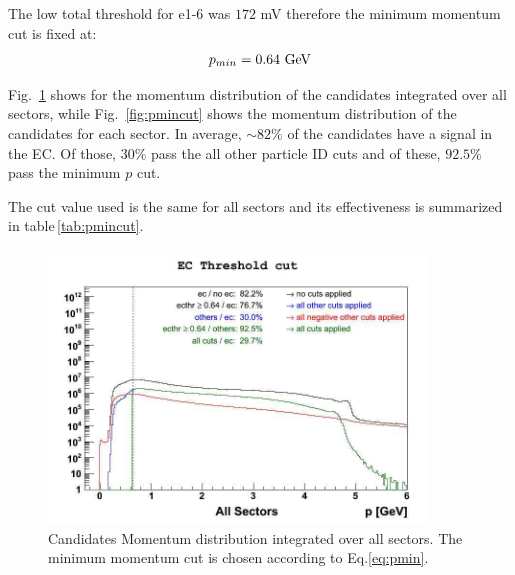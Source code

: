 The low total threshold for e1-6 was $172$ mV therefore the minimum momentum cut is fixed at:
$$
p_{min} = 0.64\,\,{\rm GeV}
$$

Fig.~\ref{fig:pmincut_alls} shows for the momentum distribution of the candidates integrated
over all sectors, while Fig.~\ref{fig:pmincut} shows the momentum distribution
of the candidates for each sector. In average, $\sim 82\%$ of the candidates 
have a signal in the EC. Of those, $30\%$ pass the all other particle ID
cuts and of these, $92.5\%$ pass the minimum $p$ cut.

The cut value used is the same for all sectors and its effectiveness is summarized in 
table\,\ref{tab:pmincut}.


\begin{figure}[h]
  \centering
		\includegraphics[width=0.9\textwidth]{img/ecthr_all_sectors.jpg}
		\caption{Candidates Momentum distribution integrated over all sectors.
					The minimum momentum cut is chosen according to Eq.\ref{eq:pmin}.}
 		\label{fig:pmincut_alls}
\end{figure}

